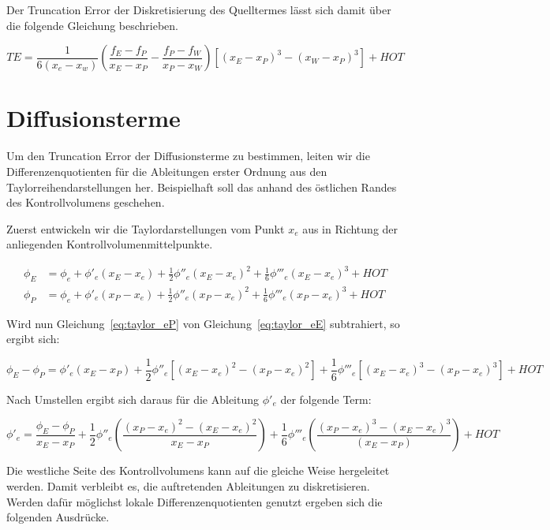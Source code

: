 \documentclass[ngerman,colorback,accentcolor=tud2d]{tudreport}
\begin{document}
Der Truncation Error der Diskretisierung des Quelltermes lässt sich damit über die
folgende Gleichung beschrieben.

\begin{equation}
  TE = \frac{1}{6(x_e-x_w)}\left(\frac{f_E-f_P}{x_E-x_P}-\frac{f_P-f_W}{x_P-x_W}\right)
  \left[{{(x_E-x_P)}^3-{(x_W-x_P)}^3}\right] + HOT
\end{equation}


\section{Diffusionsterme}
\label{sec:Diffusionsterme}


Um den Truncation Error der Diffusionsterme zu bestimmen, leiten wir die Differenzenquotienten
für die Ableitungen erster Ordnung aus den Taylorreihendarstellungen her. Beispielhaft
soll das anhand des östlichen Randes des Kontrollvolumens geschehen.

Zuerst entwickeln wir die Taylordarstellungen vom Punkt $x_e$ aus in Richtung der anliegenden
Kontrollvolumenmittelpunkte.

\begin{align}
  \phi_E &= \phi_e + \phi'_e(x_E-x_e)+\frac{1}{2}\phi''_e(x_E-x_e)^2
  +\frac{1}{6}\phi'''_e(x_E-x_e)^3+HOT
  \label{eq:taylor_eE}\\
  \phi_P &= \phi_e + \phi'_e(x_P-x_e)+\frac{1}{2}\phi''_e(x_P-x_e)^2
  +\frac{1}{6}\phi'''_e(x_P-x_e)^3+HOT
  \label{eq:taylor_eP}
\end{align}

Wird nun Gleichung~\ref{eq:taylor_eP} von Gleichung~\ref{eq:taylor_eE} subtrahiert, 
so ergibt sich:

\begin{equation*}
  \phi_E-\phi_P=\phi'_e(x_E-x_P)+
  \frac{1}{2}\phi''_e\left[{{(x_E-x_e)}^2-{(x_P-x_e)}^2}\right]+
  \frac{1}{6}\phi'''_e\left[{{(x_E-x_e)}^3-{(x_P-x_e)}^3}\right]+HOT
\end{equation*}

Nach Umstellen ergibt sich daraus für die Ableitung $\phi'_e$ der folgende Term:

\begin{equation}
  \phi'_e = \frac{\phi_E-\phi_P}{x_E-x_P}+\frac{1}{2}\phi''_e
\left({\frac{{(x_P-x_e)}^2-{(x_E-x_e)}^2}{x_E-x_P}}\right)+
\frac{1}{6} \phi'''_e \left({\frac{{(x_P-x_e)}^3-{(x_E-x_e)}^3}{(x_E-x_P)}}\right)+HOT
\end{equation}


Die westliche Seite des Kontrollvolumens kann auf die gleiche Weise hergeleitet werden.
Damit verbleibt es, die auftretenden Ableitungen zu diskretisieren. Werden dafür
möglichst lokale Differenzenquotienten genutzt ergeben sich die folgenden Ausdrücke.
\end{document}
